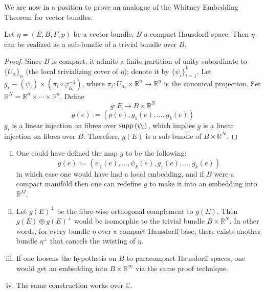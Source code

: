 \documentclass[11pt,a4paper]{article}
\begin{document}
We are now in a position to prove an analogue of the Whitney Embedding Theorem for vector bundles.
\begin{theorem}
Let $\eta = (E, B, F, p)$ be a vector bundle, $B$ a compact Hausdorff space. Then $\eta$ can be realized as a sub-bundle of a trivial bundle over $B$.
\end{theorem}

\begin{proof}
Since $B$ is compact, it admits a finite partition of unity subordinate to $\{U_{\alpha}\}_{\alpha}$ (the local trivializing cover of $\eta$); denote it by $\{\psi_i\}_{i=1}^{k}$. Let $g_i \equiv (\psi_i)\times(\pi_i\circ\varphi_{\alpha_i}^{-1})$, where $\pi_i:U_{\alpha_i}\times\mathbb{R}^n \rightarrow \mathbb{R}^n$ is the canonical projection. Set $\mathbb{R}^N = \mathbb{R}^n\times\cdots\times\mathbb{R}^n$. Define
$$g: E \rightarrow B\times\mathbb{R}^N$$
$$g(e):= (p(e), g_1(e),\ldots, g_k(e))$$
$g_i$ is a linear injection on fibres over $\operatorname{supp}{(\psi_i)}$, which implies $g$ is a linear injection on fibres over $B$.
Therefore, $g(E)$ is a sub-bundle of $B\times\mathbb{R}^N$.
\end{proof}

\begin{remark}
\begin{enumerate}[(i)]
    \item One could have defined the map $g$ to be the following:
    $$g(e):= (\psi_1(e),\ldots, \psi_k(e), g_1(e),\ldots, g_k(e))$$
    in which case one would have had a local embedding, and if $B$ were a compact manifold then one can redefine $g$ to make it into an embedding into $\mathbb{R}^M$.
    \item Let $g(E)^{\perp}$ be the fibre-wise orthogonal complement to $g(E)$. Then $g(E)\oplus g(E)^{\perp}$ would be isomorphic to the trivial bundle $B\times\mathbb{R}^N$. In other words, for every bundle $\eta$ over a compact Hausdorff base, there exists another bundle $\eta^{\perp}$ that cancels the twisting of $\eta$.
    \item If one loosens the hypothesis on $B$ to paracompact Hausdorff spaces, one would get an embedding into $B\times \mathbb{R}^{\infty}$ via the same proof technique.
    \item The same construction works over $\mathbb C$.
\end{enumerate}
\end{remark}
\end{document}
